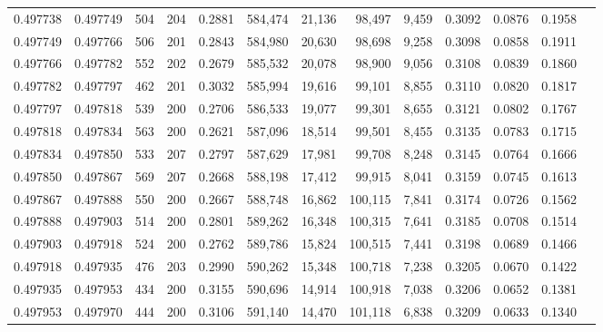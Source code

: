 \begin{tabular}{rrrrrrrrrrrrr}
0.497738 & 0.497749 &   504 & 204 &                                     0.2881 & 584,474 &  21,136 &  98,497 &   9,459 & 0.3092 & 0.0876 & 0.1958 \\
0.497749 & 0.497766 &   506 & 201 &                                     0.2843 & 584,980 &  20,630 &  98,698 &   9,258 & 0.3098 & 0.0858 & 0.1911 \\
0.497766 & 0.497782 &   552 & 202 &                                     0.2679 & 585,532 &  20,078 &  98,900 &   9,056 & 0.3108 & 0.0839 & 0.1860 \\
0.497782 & 0.497797 &   462 & 201 &                                     0.3032 & 585,994 &  19,616 &  99,101 &   8,855 & 0.3110 & 0.0820 & 0.1817 \\
0.497797 & 0.497818 &   539 & 200 &                                     0.2706 & 586,533 &  19,077 &  99,301 &   8,655 & 0.3121 & 0.0802 & 0.1767 \\
0.497818 & 0.497834 &   563 & 200 &                                     0.2621 & 587,096 &  18,514 &  99,501 &   8,455 & 0.3135 & 0.0783 & 0.1715 \\
0.497834 & 0.497850 &   533 & 207 &                                     0.2797 & 587,629 &  17,981 &  99,708 &   8,248 & 0.3145 & 0.0764 & 0.1666 \\
0.497850 & 0.497867 &   569 & 207 &                                     0.2668 & 588,198 &  17,412 &  99,915 &   8,041 & 0.3159 & 0.0745 & 0.1613 \\
0.497867 & 0.497888 &   550 & 200 &                                     0.2667 & 588,748 &  16,862 & 100,115 &   7,841 & 0.3174 & 0.0726 & 0.1562 \\
0.497888 & 0.497903 &   514 & 200 &                                     0.2801 & 589,262 &  16,348 & 100,315 &   7,641 & 0.3185 & 0.0708 & 0.1514 \\
0.497903 & 0.497918 &   524 & 200 &                                     0.2762 & 589,786 &  15,824 & 100,515 &   7,441 & 0.3198 & 0.0689 & 0.1466 \\
0.497918 & 0.497935 &   476 & 203 &                                     0.2990 & 590,262 &  15,348 & 100,718 &   7,238 & 0.3205 & 0.0670 & 0.1422 \\
0.497935 & 0.497953 &   434 & 200 &                                     0.3155 & 590,696 &  14,914 & 100,918 &   7,038 & 0.3206 & 0.0652 & 0.1381 \\
0.497953 & 0.497970 &   444 & 200 &                                     0.3106 & 591,140 &  14,470 & 101,118 &   6,838 & 0.3209 & 0.0633 & 0.1340 \\

\end{tabular}
